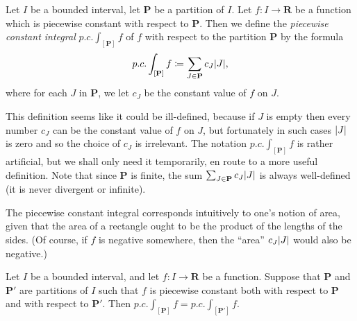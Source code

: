 \begin{definition}\label{11.2.9}
    Let \(I\) be a bounded interval, let \(\mathbf{P}\) be a partition of \(I\).
    Let \(f : I \to \mathbf{R}\) be a function which is piecewise constant with respect to \(\mathbf{P}\).
    Then we define the \emph{piecewise constant integral} \(p.c. \int_{[\mathbf{P}]} f\) of \(f\) with respect to the partition \(\mathbf{P}\) by the formula
    \[
        p.c. \int_{[\mathbf{P}]} f \coloneqq \sum_{J \in \mathbf{P}} c_J \abs*{J},
    \]
    where for each \(J\) in \(\mathbf{P}\), we let \(c_J\) be the constant value of \(f\) on \(J\).
\end{definition}

\begin{remark}\label{11.2.10}
    This definition seems like it could be ill-defined, because if \(J\) is empty then every number \(c_J\) can be the constant value of \(f\) on \(J\), but fortunately in such cases \(\abs*{J}\) is zero and so the choice of \(c_J\) is irrelevant.
    The notation \(p.c. \int_{[\mathbf{P}]} f\) is rather artificial, but we shall only need it temporarily, en route to a more useful definition.
    Note that since \(\mathbf{P}\) is finite, the sum \(\sum_{J \in \mathbf{P}} c_J \abs*{J}\) is always well-defined
    (it is never divergent or infinite).
\end{remark}

\begin{remark}\label{11.2.11}
    The piecewise constant integral corresponds intuitively to one's notion of area, given that the area of a rectangle ought to be the product of the lengths of the sides.
    (Of course, if \(f\) is negative somewhere, then the ``area'' \(c_J \abs*{J}\) would also be negative.)
\end{remark}

\setcounter{theorem}{12}
\begin{proposition}\label{11.2.13}
    Let \(I\) be a bounded interval, and let \(f : I \to \mathbf{R}\) be a function.
    Suppose that \(\mathbf{P}\) and \(\mathbf{P}'\) are partitions of \(I\) such that \(f\) is piecewise constant both with respect to \(\mathbf{P}\) and with respect to \(\mathbf{P}'\).
    Then \(p.c. \int_{[\mathbf{P}]} f = p.c. \int_{[\mathbf{P}']} f\).
\end{proposition}

